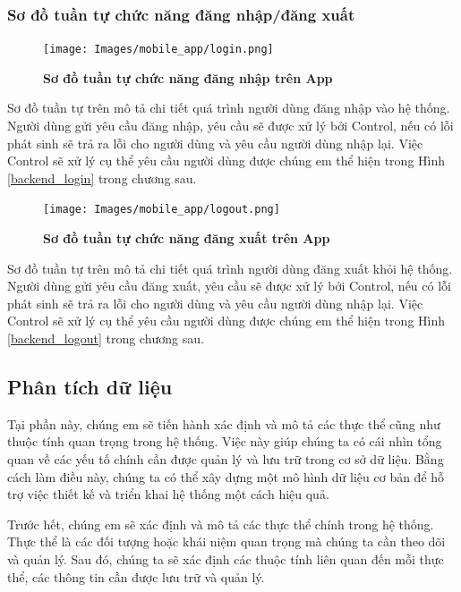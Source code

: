 \subsubsection{Sơ đồ tuần tự chức năng đăng nhập/đăng xuất}

    \begin{figure}[H]
         \centering
         \texttt{[image: Images/mobile\_app/login.png]}
         \caption[Sơ đồ tuần tự chức năng đăng nhập trên App]{\bfseries \fontsize{12pt}{0pt}
         \selectfont Sơ đồ tuần tự chức năng đăng nhập trên App}
         \label{login} %
    \end{figure}

  Sơ đồ tuần tự trên mô tả chi tiết quá trình người dùng đăng nhập vào hệ thống. Người dùng gửi yêu cầu đăng nhập, yêu cầu sẽ
  được xử lý bởi Control, nếu có lỗi phát sinh sẽ trả ra lỗi cho người dùng và yêu cầu người dùng nhập lại. Việc Control
  sẽ xử lý cụ thể yêu cầu người dùng được chúng em thể hiện trong Hình \ref{backend_login} trong chương sau.

  \begin{figure}[H]
    \centering
    \texttt{[image: Images/mobile\_app/logout.png]}
    \caption[Sơ đồ tuần tự chức năng đăng xuất trên App]{\bfseries \fontsize{12pt}{0pt}
    \selectfont Sơ đồ tuần tự chức năng đăng xuất trên App}
    \label{logout} %
\end{figure}

Sơ đồ tuần tự trên mô tả chi tiết quá trình người dùng đăng xuất khỏi hệ thống. Người dùng gửi yêu cầu đăng xuất, yêu cầu sẽ
được xử lý bởi Control, nếu có lỗi phát sinh sẽ trả ra lỗi cho người dùng và yêu cầu người dùng nhập lại. Việc Control
sẽ xử lý cụ thể yêu cầu người dùng được chúng em thể hiện trong Hình \ref{backend_logout} trong chương sau.

\subsection{Phân tích dữ liệu}

Tại phần này, chúng em sẽ tiến hành xác định và mô tả các thực thể cũng như
 thuộc tính quan trọng trong hệ thống. Việc này giúp chúng ta có cái
  nhìn tổng quan về các yếu tố chính cần được quản lý và lưu trữ
   trong cơ sở dữ liệu. Bằng cách làm điều này, chúng ta có thể
    xây dựng một mô hình dữ liệu cơ bản để hỗ trợ việc thiết kế và
     triển khai hệ thống một cách hiệu quả.

     Trước hết, chúng em sẽ xác định và mô tả các thực thể chính trong hệ
      thống. Thực thể là các đối tượng hoặc khái niệm quan
       trọng mà chúng ta cần theo dõi và quản lý. Sau đó, chúng ta sẽ xác
        định các thuộc tính liên quan đến mỗi thực thể, các thông tin cần
         được lưu trữ và quản lý.

